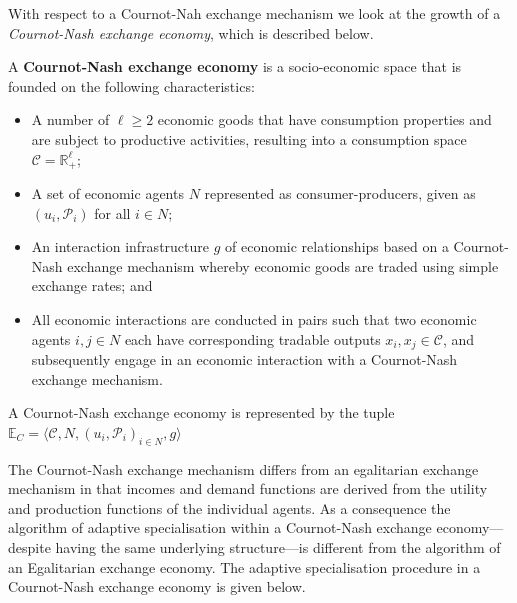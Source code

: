 With respect to a Cournot-Nah exchange mechanism we look at the growth of a \emph{Cournot-Nash exchange economy}, which is described below.
\begin{definition}
A \textbf{Cournot-Nash exchange economy} is a socio-economic space that is founded on the following characteristics:
\begin{itemize}
	\item A number of $\ell \geqslant 2$ economic goods that have consumption properties and are subject to productive activities, resulting into a consumption space $\mathcal{C} = \mathbb{R}^{\ell}_{+}$;

	\item A set of economic agents $N$ represented as consumer-producers, given as $\left( u_{i}, \mathcal{P}_{i} \right)$ for all $i \in N$;

	\item An interaction infrastructure $g$ of economic relationships based on a Cournot-Nash exchange mechanism whereby economic goods are traded using simple exchange rates; and

	\item All economic interactions are conducted in pairs such that two economic agents $i,j \in N$ each have corresponding tradable outputs $x_{i}, x_{j} \in \mathcal{C}$, and subsequently engage in an economic interaction with a Cournot-Nash exchange mechanism.
\end{itemize}
A Cournot-Nash exchange economy is represented by the tuple $\mathbb{E}_{C} = \big \langle \mathcal{C}, N, (u_{i}, \mathcal{P}_{i})_{i \in N}, g \big \rangle$
\end{definition}

The Cournot-Nash exchange mechanism differs from an egalitarian exchange mechanism in that incomes and demand functions are derived from the utility and production functions of the individual agents. As a consequence the algorithm of adaptive specialisation within a Cournot-Nash exchange economy---despite having the same underlying structure---is different from the algorithm of an Egalitarian exchange economy. The adaptive specialisation procedure in a Cournot-Nash exchange economy is given below.

